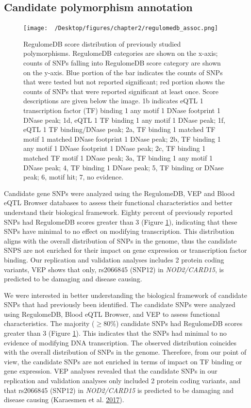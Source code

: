 \documentclass[]{DissertateOSU}
\begin{document}
\subsection{Candidate polymorphism
annotation}\label{candidate-polymorphism-annotation}

\begin{figure}
    \centering
    \texttt{[image: ~/Desktop/figures/chapter2/regulomedb\_assoc.png]}
    \caption[RegulomeDB score distribution of previously studied polymorphisms.]{RegulomeDB score distribution of previously studied polymorphisms. RegulomeDB categories are shown on the x-axis; counts of SNPs falling into RegulomeDB score category are shown on the y-axis. Blue portion of the bar indicates the counts of SNPs that were tested but not reported significant; red portion shows the counts of SNPs that were reported significant at least once. Score descriptions are given below the image. 1b indicates eQTL 1 transcription factor (TF) binding 1 any motif 1 DNase footprint 1 DNase peak; 1d, eQTL 1 TF binding 1 any motif 1 DNase peak; 1f, eQTL 1 TF binding/DNase peak; 2a, TF binding 1 matched TF motif 1 matched DNase footprint 1 DNase peak; 2b, TF binding 1 any motif 1 DNase footprint 1 DNase peak; 2c, TF binding 1 matched TF motif 1 DNase peak; 3a, TF binding 1 any motif 1 DNase peak; 4, TF binding 1 DNase peak; 5, TF binding or DNase peak; 6, motif hit; 7, no evidence.}
    \label{fig:regdb}
\end{figure}

Candidate gene SNPs were analyzed using the RegulomeDB, VEP and Blood
eQTL Browser databases to assess their functional characteristics and
better understand their biological framework. Eighty percent of
previously reported SNPs had RegulomeDB scores greater than 3 (Figure
\ref{fig:regdb}), indicating that these SNPs have minimal to no effect
on modifying transcription. This distribution aligns with the overall
distribution of SNPs in the genome, thus the candidate SNPS are not
enriched for their impact on gene expression or transcription factor
binding. Our replication and validation analyses includes 2 protein
coding variants, VEP shows that only, rs2066845 (SNP12) in
\emph{NOD2/CARD15}, is predicted to be damaging and disease causing.

We were interested in better understanding the biological framework of
candidate SNPs that had previously been identified. The candidate SNPs
were analyzed using RegulomeDB, Blood eQTL Browser, and VEP to assess
functional characteristics. The majority (\(\geq 80\%\)) candidate SNPs
had RegulomeDB scores greater than 3 (Figure \ref{fig:regdb}). This
indicates that the SNPs had minimal to no evidence of modifying DNA
transcription. The observed distribution coincides with the overall
distribution of SNPs in the genome. Therefore, from our point of view,
the candidate SNPs are not enriched in terms of impact on TF binding or
gene expression. VEP analyses revealed that the candidate SNPs in our
replication and validation analyses only included 2 protein coding
variants, and that rs2066845 (SNP12) in \emph{NOD2/CARD15} is predicted
to be damaging and disease causing (Karaesmen et al.
\protect\hyperlink{ref-Karaesmen_2017}{2017}).
\end{document}

